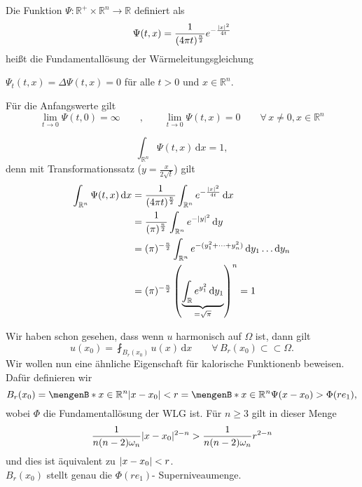 \begin{definition}
	Die Funktion $\Psi : \mathbb{R}^+ \times \mathbb{R}^n \to \mathbb{R}$ definiert als 
	\[
		\Psi(t,x) = \frac{1}{(4 \pi t)^{\frac{n}{2}}} e^{-\frac{\lvert x\rvert^2}{4t}}
	\]
	heißt die Fundamentallösung der Wärmeleitungsgleichung
\end{definition}
\begin{bemerkung}
	\item $ \Psi_t(t,x) = \Delta \Psi(t,x) = 0$ für alle $t>0$ und $x \in \mathbb{R}^n$.
	\item Für die Anfangswerte gilt
	\[
		\lim_{t \to 0} \Psi(t,0) = \infty \qquad , \qquad \lim_{t \to 0} \Psi(t,x) = 0 \qquad \forall\, x \neq 0, x \in \mathbb{R}^n
	\]
	\item \[
		\int_{\mathbb{R}^n}^{} \Psi(t,x) \,\mathrm{d}x = 1,
	\]
	denn mit Transformationssatz ($ y = \frac{x}{2 \sqrt{t}}$) gilt
	\begin{align*}
		\int_{\mathbb{R}^n}^{}\Psi(t,x) \,\mathrm{d}x &= \frac{1}{(4 \pi t)^{\frac{n}{2}}} \int_{\mathbb{R}^n}^{}e^{-\frac{\lvert x\rvert^2}{4t}} \,\mathrm{d}x \\
		&= \frac{1}{(\pi)^{\frac{n}{2}}} \int_{\mathbb{R}^n}^{} e^{- \lvert y\rvert^2} \,\mathrm{d}y \\
		&= (\pi)^{- \frac{n}{2}} \int_{\mathbb{R}^n}^{} e^{-(y_1^2 + \dots + y_n^2)} \,\mathrm{d}y_1 \dots \mathrm{d}y_n \\
		&= (\pi)^{- \frac{n}{2}} \left( \underset{= \sqrt{\pi}}{\underbrace{\int_{\mathbb{R}}^{} e^{y_1^2} \,\mathrm{d}y_1}} \right)^n = 1
	\end{align*}
\end{bemerkung}
Wir haben schon gesehen, dass wenn $u$ harmonisch auf $\Omega$ ist, dann gilt
\[
	u(x_0) = \fint_{B_r(x_0)}^{} u(x) \,\mathrm{d}x \qquad \forall\, B_r(x_0) \subset \subset \Omega.
\]
Wir wollen nun eine ähnliche Eigenschaft für kalorische Funktionenb beweisen. Dafür definieren wir
\[
	B_r(x_0) = \set[x \in \mathbb{R}^n]{\abs{x-x_0}< r} = \set[x \in \mathbb{R}^n]{\Psi(x-x_0) > \Phi(re_1)},
\]
wobei $\Phi$ die Fundamentallösung der WLG ist. Für $n \geq 3$ gilt in dieser Menge
\[
	\frac{1}{n(n-2)\omega_n} \lvert x- x_0\rvert^{2-n} > \frac{1}{n(n-2)\omega_n} r ^{2-n}
\]
und dies ist äquivalent zu $\lvert x-x_0\rvert<r$.\\
$B_r(x_0)$ stellt genau die $\Phi(re_1)$- Superniveaumenge.

